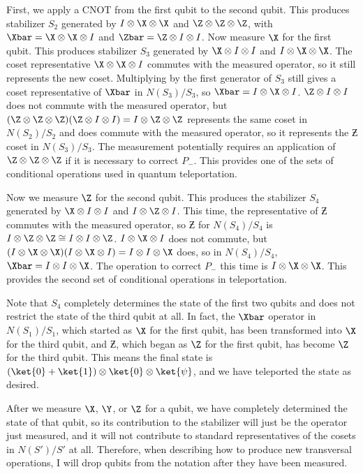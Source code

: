First, we apply a CNOT from the first qubit to the second qubit.  This
produces stabilizer $S_2$ generated by $I \otimes \X \otimes \X$ and $\Z
\otimes \Z \otimes \Z$, with $\Xbar = \X \otimes \X \otimes I$ and $\Zbar
= \Z \otimes I \otimes I$.  Now measure $\X$ for the first qubit.  This
produces stabilizer $S_3$ generated by $\X \otimes I \otimes I$ and $I
\otimes \X \otimes \X$.  The coset representative $\X \otimes \X \otimes
I$ commutes with the measured operator, so it still represents the new
coset.  Multiplying by the first generator of $S_3$ still gives a coset
representative of $\Xbar$ in $N(S_3)/S_3$, so $\Xbar = I \otimes \X
\otimes I$.  $\Z \otimes I \otimes I$ does not commute with the measured
operator, but $(\Z \otimes \Z \otimes \Z) (\Z \otimes I \otimes I) = I
\otimes \Z \otimes \Z$ represents the same coset in $N(S_2)/S_2$ and
does commute with the measured operator, so it represents the $\Zbar$
coset in $N(S_3)/S_3$.  The measurement potentially requires an application
of $\Z \otimes \Z \otimes \Z$ if it is necessary to correct $P_-$.  This
provides one of the sets of conditional operations used in quantum
teleportation.

Now we measure $\Z$ for the second qubit.  This produces the stabilizer
$S_4$ generated by $\X \otimes I \otimes I$ and $I \otimes \Z \otimes I$.
This time, the representative of $\Zbar$ commutes with the measured
operator, so $\Zbar$ for $N(S_4)/S_4$ is $I \otimes \Z \otimes \Z \cong I
\otimes I \otimes \Z$.  $I \otimes \X \otimes I$ does not commute, but $(I
\otimes \X \otimes \X) (I \otimes \X \otimes I) = I \otimes I \otimes \X$
does, so in $N(S_4)/S_4$, $\Xbar = I \otimes I \otimes \X$.  The operation
to correct $P_-$ this time is $I \otimes \X \otimes \X$.  This provides the
second set of conditional operations in teleportation.

Note that $S_4$ completely determines the state of the first two qubits and
does not restrict the state of the third qubit at all.  In fact, the $\Xbar$
operator in $N(S_1)/S_1$, which started as $\X$ for the first qubit, has
been transformed into $\X$ for the third qubit, and $\Zbar$, which began
as $\Z$ for the first qubit, has become $\Z$ for the third qubit.  This means
the final state is $(\ket{0} + \ket{1}) \otimes \ket{0} \otimes \ket{\psi}$,
and we have teleported the state as desired.

After we measure $\X$, $\Y$, or $\Z$ for a qubit, we have completely
determined the state of that qubit, so its contribution to the stabilizer will
just be the operator just measured, and it will not contribute to standard
representatives of the cosets in $N(S')/S'$ at all.  Therefore, when
describing how to produce new transversal operations, I will drop qubits
from the notation after they have been measured.

